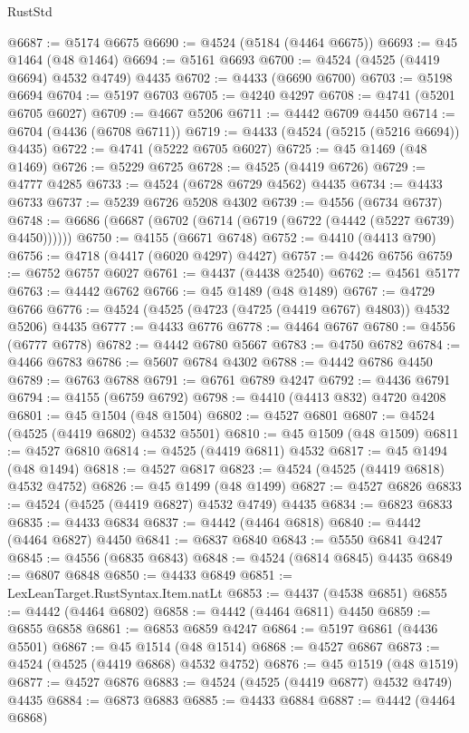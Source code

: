\begin{lexlean}{RustStd}
\begin{coremodule}
@6687 := @5174 @6675
@6690 := @4524 (@5184 (@4464 @6675))
@6693 := @45 @1464 (@48 @1464)
@6694 := @5161 @6693
@6700 := @4524 (@4525 (@4419 @6694) @4532 @4749) @4435
@6702 := @4433 (@6690 @6700)
@6703 := @5198 @6694
@6704 := @5197 @6703
@6705 := @4240 @4297
@6708 := @4741 (@5201 @6705 @6027)
@6709 := @4667 @5206
@6711 := @4442 @6709 @4450
@6714 := @6704 (@4436 (@6708 @6711))
@6719 := @4433 (@4524 (@5215 (@5216 @6694)) @4435)
@6722 := @4741 (@5222 @6705 @6027)
@6725 := @45 @1469 (@48 @1469)
@6726 := @5229 @6725
@6728 := @4525 (@4419 @6726)
@6729 := @4777 @4285
@6733 := @4524 (@6728 @6729 @4562) @4435
@6734 := @4433 @6733
@6737 := @5239 @6726 @5208 @4302
@6739 := @4556 (@6734 @6737)
@6748 := @6686 (@6687 (@6702 (@6714 (@6719 (@6722 (@4442 (@5227 @6739) @4450))))))
@6750 := @4155 (@6671 @6748)
@6752 := @4410 (@4413 @790)
@6756 := @4718 (@4417 (@6020 @4297) @4427)
@6757 := @4426 @6756
@6759 := @6752 @6757 @6027
@6761 := @4437 (@4438 @2540)
@6762 := @4561 @5177
@6763 := @4442 @6762
@6766 := @45 @1489 (@48 @1489)
@6767 := @4729 @6766
@6776 := @4524 (@4525 (@4723 (@4725 (@4419 @6767) @4803)) @4532 @5206) @4435
@6777 := @4433 @6776
@6778 := @4464 @6767
@6780 := @4556 (@6777 @6778)
@6782 := @4442 @6780 @5667
@6783 := @4750 @6782
@6784 := @4466 @6783
@6786 := @5607 @6784 @4302
@6788 := @4442 @6786 @4450
@6789 := @6763 @6788
@6791 := @6761 @6789 @4247
@6792 := @4436 @6791
@6794 := @4155 (@6759 @6792)
@6798 := @4410 (@4413 @832) @4720 @4208
@6801 := @45 @1504 (@48 @1504)
@6802 := @4527 @6801
@6807 := @4524 (@4525 (@4419 @6802) @4532 @5501)
@6810 := @45 @1509 (@48 @1509)
@6811 := @4527 @6810
@6814 := @4525 (@4419 @6811) @4532
@6817 := @45 @1494 (@48 @1494)
@6818 := @4527 @6817
@6823 := @4524 (@4525 (@4419 @6818) @4532 @4752)
@6826 := @45 @1499 (@48 @1499)
@6827 := @4527 @6826
@6833 := @4524 (@4525 (@4419 @6827) @4532 @4749) @4435
@6834 := @6823 @6833
@6835 := @4433 @6834
@6837 := @4442 (@4464 @6818)
@6840 := @4442 (@4464 @6827) @4450
@6841 := @6837 @6840
@6843 := @5550 @6841 @4247
@6845 := @4556 (@6835 @6843)
@6848 := @4524 (@6814 @6845) @4435
@6849 := @6807 @6848
@6850 := @4433 @6849
@6851 := LexLeanTarget.RustSyntax.Item.natLt
@6853 := @4437 (@4538 @6851)
@6855 := @4442 (@4464 @6802)
@6858 := @4442 (@4464 @6811) @4450
@6859 := @6855 @6858
@6861 := @6853 @6859 @4247
@6864 := @5197 @6861 (@4436 @5501)
@6867 := @45 @1514 (@48 @1514)
@6868 := @4527 @6867
@6873 := @4524 (@4525 (@4419 @6868) @4532 @4752)
@6876 := @45 @1519 (@48 @1519)
@6877 := @4527 @6876
@6883 := @4524 (@4525 (@4419 @6877) @4532 @4749) @4435
@6884 := @6873 @6883
@6885 := @4433 @6884
@6887 := @4442 (@4464 @6868)

\end{coremodule}
\end{lexlean}
